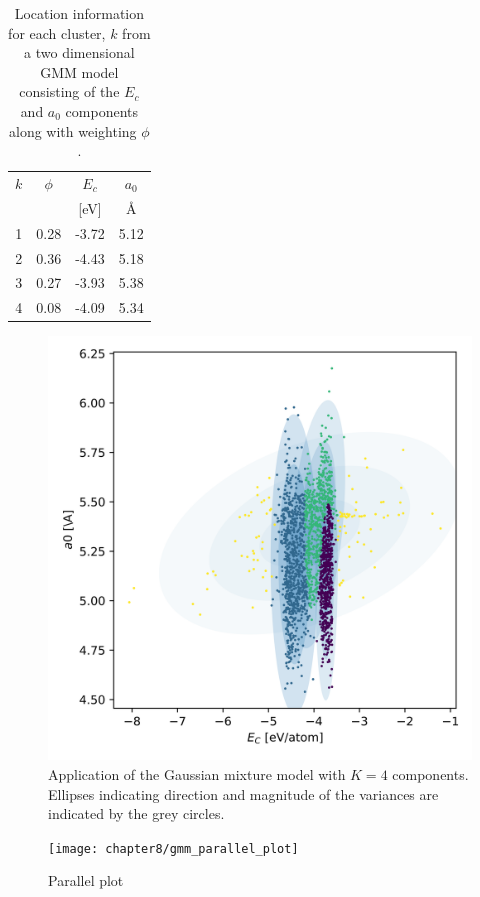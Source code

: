\begin{table}[ht]
	\centering
	\caption{Location information for each cluster, $k$  from a two dimensional GMM model consisting of the $E_c$ and $a_0$ components along with weighting $\phi$.}
	\label{tbl:sw_2parameter_gmm}
	\begin{tabular}{c c c c}
    \hline
    $k$ & $\phi$ & $E_c$ & $a_0$ \\
        &        & [eV]  & \AA   \\
    \hline
    1 & 0.28 & -3.72  & 5.12 \\
    2 & 0.36 & -4.43  & 5.18 \\
    3 & 0.27 & -3.93  & 5.38 \\
    4 & 0.08 & -4.09  & 5.34 \\
    \hline
  \end{tabular}
\end{table}

\begin{figure}[ht]
	\centering
	\includegraphics[width=5in]{chapter8/Si_Ec_a0_gmm}
	\caption{Application of the Gaussian mixture model with $K=4$ components.  Ellipses indicating direction and magnitude of the variances are indicated by the grey circles.}
	\label{fig:Si_Ec_a0_gmm}
\end{figure}

\begin{figure}[hbt]
	\centering
	\captionsetup{justification=centering,margin=1in}
	\texttt{[image: chapter8/gmm\_parallel\_plot]}
	\caption{Parallel plot}
	\label{fig:Si_gmm_parallel_plot_2_qoi}
\end{figure}


